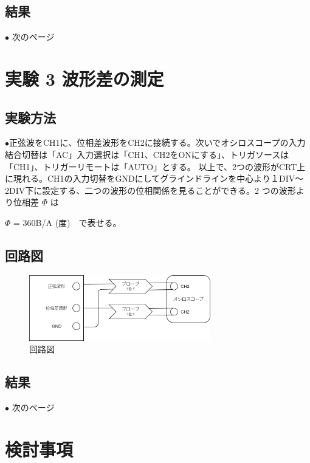 \documentclass[10pt]{article}
\begin{document}
\subsection{結果}
$\bullet$ 次のページ
\pagebreak

\section{実験 3 波形差の測定}
\subsection{実験方法}
$\bullet$正弦波をCH1に、位相差波形をCH2に接続する。次いでオシロスコープの入力結合切替は「AC」入力選択は「CH1、CH2をONにする」、トリガソースは「CH1」、トリガーリモートは「AUTO」とする。 以上で、2つの波形がCRT上に現れる。CH1の入力切替をGNDにしてグラインドラインを中心より１DIV～2DIV下に設定する、二つの波形の位相関係を見ることができる。2 つの波形より位相差 \(\Phi\) は \\

\begin{center}
    \(\Phi\) = 360B/A (度)　で表せる。
\end{center}

\subsection{回路図}
\begin{figure}[H]
	\centering
	\includegraphics[width=0.704\textwidth]{exp3.png}
	\caption{回路図}
\end{figure}

\subsection{結果}
$\bullet$ 次のページ

\pagebreak

\section{検討事項}
\end{document}
